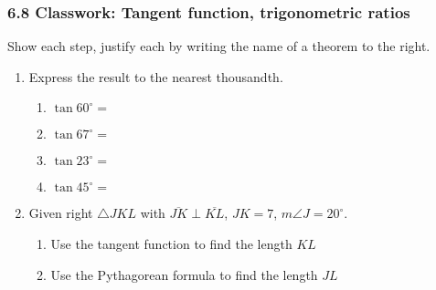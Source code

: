 \documentclass[12pt, oneside]{article}
\begin{document}
\subsubsection*{6.8 Classwork: Tangent function, trigonometric ratios}
Show each step, justify each by writing the name of a theorem to the right.  \begin{enumerate}

    \item Express the result to the nearest thousandth.  \vspace{.5cm}
      \begin{multicols}{2}
        \begin{enumerate}
          \item $\tan 60^\circ = $ \vspace{1cm}
          \item $\tan 67^\circ =$
          \item $\tan 23^\circ = $ \vspace{1cm}
          \item $\tan 45^\circ =$
        \end{enumerate}
      \end{multicols} \vspace{1cm}

      \item Given right $\triangle JKL$ with $\overline{JK} \perp \overline{KL}$, $JK=7$, $m\angle J=20^\circ$.
      \begin{flushright}
         \vspace{1cm}
      \end{flushright}
      \begin{enumerate}
        \item Use the tangent function to find the length $KL$\\[3cm]
        \item Use the Pythagorean formula to find the length $JL$\\[3cm]


\end{enumerate}
\end{enumerate}
\end{document}
